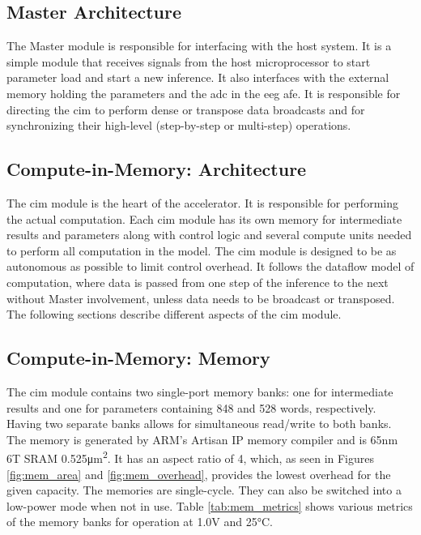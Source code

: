 \subsection{Master Architecture}
The Master module is responsible for interfacing with the host system. It is a simple module that receives signals from the host microprocessor to start parameter load and
start a new inference. It also interfaces with the external memory holding the parameters and the \ac{adc} in the \ac{eeg} \ac{afe}. It is responsible for directing the \ac{cim}
to perform dense or transpose data broadcasts and for synchronizing their high-level (step-by-step or multi-step) operations.

\subsection{Compute-in-Memory: Architecture}
The \ac{cim} module is the heart of the accelerator. It is responsible for performing the actual computation. Each \ac{cim} module has its own memory for intermediate results and
parameters along with control logic and several compute units needed to perform all computation in the model. The \ac{cim} module is designed to be as autonomous as possible to limit
control overhead. It follows the dataflow model of computation, where data is passed from one step of the inference to the next without Master involvement, unless data needs to be
broadcast or transposed. The following sections describe different aspects of the \ac{cim} module.

\subsection{Compute-in-Memory: Memory}
The \ac{cim} module contains two single-port memory banks: one for intermediate results and one for parameters containing 848 and 528 words, respectively. Having two separate banks
allows for simultaneous read/write to both banks. The memory is generated by ARM's Artisan IP memory compiler and is 65nm 6T SRAM 0.525\si{\square\micro\meter}. It has an aspect ratio of
4, which, as seen in Figures \ref{fig:mem_area} and \ref{fig:mem_overhead}, provides the lowest overhead for the given capacity. The memories are single-cycle. They can also be switched
into a low-power mode when not in use. Table \ref{tab:mem_metrics} shows various metrics of the memory banks for operation at 1.0V and 25\si{\degreeCelsius}.

